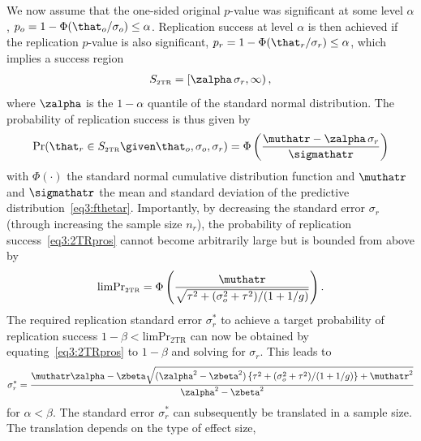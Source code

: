 We now assume that the one-sided original $p$-value was significant at some
level $\alpha$, \ie{}
\mbox{$p_{o} = 1 - \Phi(\that_{o}/\sigma_{o}) \leq \alpha$}. Replication success
at level $\alpha$ %
is then achieved if the replication \mbox{$p$-value} is also significant, \ie{}
$p_{r} = 1 - \Phi(\that_{r}/\sigma_{r}) \leq \alpha$, which implies a success
region
\begin{align*}
  S_{\scriptscriptstyle \text{2TR}}
  = \left[\zalpha\, \sigma_{r}, \infty \right),
\end{align*}
where $\zalpha$ is the $1 - \alpha$ quantile of the standard
normal distribution. The probability of replication success is thus given by
\begin{align}
  \label{eq3:2TRpros}
  \Pr(\that_{r} \in S_{\scriptscriptstyle \text{2TR}} \given \that_{o}, \sigma_{o}, \sigma_{r})
  = %
  \Phi\left(\frac{\muthatr - \zalpha \, \sigma_{r}}{\sigmathatr}\right)
\end{align}
with $\Phi(\cdot)$ the standard normal cumulative distribution function and
$\muthatr$ and $\sigmathatr$ the mean and standard deviation of the predictive
distribution~\eqref{eq3:fthetar}. %
Importantly, by decreasing the standard error $\sigma_{r}$ (through increasing
the sample size $n_{r}$), the probability of replication
success~\eqref{eq3:2TRpros} cannot become arbitrarily large but is bounded from
above by
\begin{align}
  \label{eq3:limP2TR}
  \text{limPr}_{\scriptscriptstyle \text{2TR}} =
  \Phi\left(\frac{ \muthatr}{\sqrt{
\tau^{2} + (\sigma^{2}_{o} + \tau^{2})/(1 + 1/g)}}\right).
\end{align}
The required replication standard error $\sigma_{r}^{*}$ to achieve a target
probability of replication success
$1 - \beta < \text{limPr}_{\scriptscriptstyle \text{2TR}}$ can now be obtained
by equating~\eqref{eq3:2TRpros} to $1 - \beta$ and solving for $\sigma_{r}$. This
leads to
\begin{align}
  \label{eq3:ssd2tr}
  \sigma_{r}^{*} =
  \frac{\muthatr \zalpha - \zbeta\sqrt{
  (\zalpha^{2} - \zbeta^{2})\left\{\tau^{2} + (\sigma^{2}_{o} +
  \tau^{2})/(1 + 1/g)\right\} + \muthatr^{2}}}{\zalpha^{2} - \zbeta^{2}}
\end{align}
for $\alpha < \beta$. The standard error $\sigma_{r}^{*}$ can subsequently be
translated in a sample size. The translation depends on the type of effect size,
